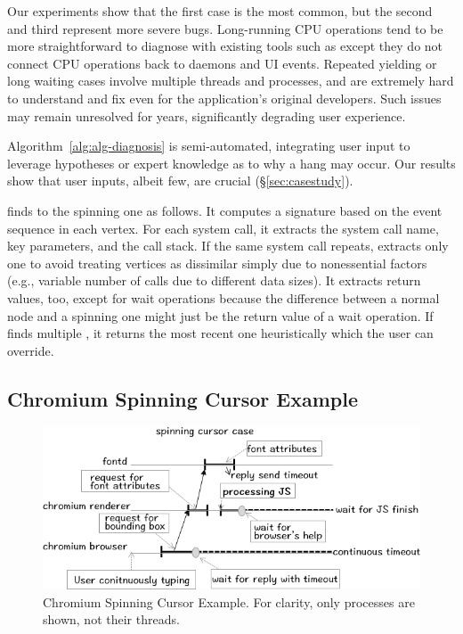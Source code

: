 Our experiments show that the first case is the most common, but the
second and third represent more severe bugs. Long-running CPU operations
tend to be more straightforward to diagnose with existing tools such as
\spindump except they do not connect CPU operations back to daemons and UI
events. Repeated yielding or long waiting cases involve multiple threads
and processes, and are extremely hard to understand and fix even for the
application's original developers.  Such issues may remain unresolved for
years, significantly degrading user experience.

Algorithm~\ref{alg:alg-diagnosis} is semi-automated, integrating user
input to leverage hypotheses or expert knowledge as to why a hang may
occur. Our results show that user inputs, albeit few, are crucial
(\S\ref{sec:casestudy}).

 \xxx finds \similarnodes to the spinning one
as follows. It computes a signature based on the event sequence in each
vertex. For each system call, it extracts the system call name, key
parameters, and the call stack. If the same system call repeats, \xxx
extracts only one to avoid treating vertices as dissimilar simply due to
nonessential factors (e.g., variable number of  calls due to
different data sizes).  It extracts return values, too, except for wait
operations because the difference between a normal node and a spinning one
might just be the return value of a wait operation.  If \xxx finds
multiple \similarnodes, it returns the most recent one heuristically
which the user can override.

\subsection{Chromium Spinning Cursor Example} \label{subsec:chromium}

\begin{figure}[tb]
	\footnotesize
    \centering
	\includegraphics[width=\columnwidth]{./figures/chromium_case_study.png}
    \caption{Chromium Spinning Cursor Example. For clarity, only processes are
shown, not their threads.}
    \label{fig:chromium-case-study}
\end{figure}

